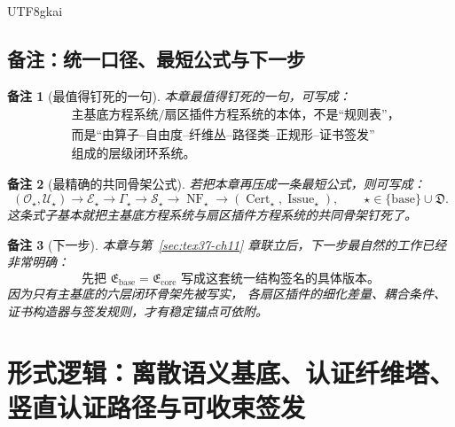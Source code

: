 \documentclass[12pt]{article}
\newtheorem{remark}{备注}[section]
\newcommand{\Cert}{\operatorname{Cert}}
\newcommand{\Issue}{\operatorname{Issue}}
\begin{document}
\begin{CJK*}{UTF8}{gkai}
\subsection{备注：统一口径、最短公式与下一步}
\label{subsec:tex37-ch12-remarks}

\begin{remark}[最值得钉死的一句]
本章最值得钉死的一句，可写成：
\[
  \boxed{
    \begin{aligned}
      &\text{主基底方程系统/扇区插件方程系统的本体，不是“规则表”，}\\
      &\text{而是“由算子--自由度--纤维丛--路径类--正规形--证书签发”}\\
      &\text{组成的层级闭环系统。}
    \end{aligned}
  }
\]
\end{remark}

\begin{remark}[最精确的共同骨架公式]
若把本章再压成一条最短公式，则可写成：
\[
  \boxed{
    (\mathcal O_\star,\mathcal U_\star)
    \to
    \mathcal E_\star
    \to
    \Gamma_\star
    \to
    \mathcal S_\star
    \to
    \operatorname{NF}_\star
    \to
    (\Cert_\star,\Issue_\star),
    \qquad
    \star\in \{\mathrm{base}\}\cup\mathfrak D.
  }
\]
这条式子基本就把主基底方程系统与扇区插件方程系统的共同骨架钉死了。
\end{remark}

\begin{remark}[下一步]
本章与第~\ref{sec:tex37-ch11} 章联立后，下一步最自然的工作已经非常明确：
\[
  \boxed{
    \text{先把 }\mathfrak E_{\mathrm{base}}=\mathfrak E_{\mathrm{core}}\text{ 写成这套统一结构签名的具体版本。}
  }
\]
因为只有主基底的六层闭环骨架先被写实，
各扇区插件的细化差量、耦合条件、证书构造器与签发规则，才有稳定锚点可依附。
\end{remark}

\clearpage

\section{形式逻辑：离散语义基底、认证纤维塔、竖直认证路径与可收束签发}
\label{sec:tex37-ch13}


\end{CJK*}
\end{document}
